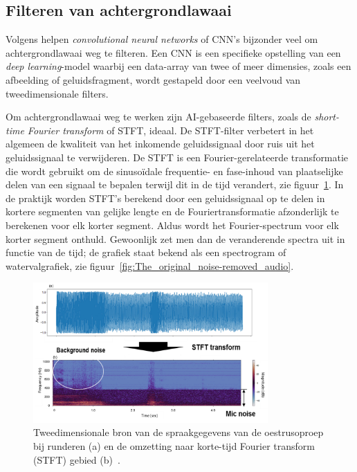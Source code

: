 \subsection{Filteren van achtergrondlawaai}
Volgens \textcite{Jung2021} helpen \textit{convolutional neural networks} of CNN's bijzonder veel om achtergrondlawaai weg te filteren. Een CNN is een specifieke opstelling van een \textit{deep learning}-model waarbij een data-array van twee of meer dimensies, zoals een afbeelding of geluidsfragment, wordt gestapeld door een veelvoud van tweedimensionale filters.

Om achtergrondlawaai weg te werken zijn AI-gebaseerde filters, zoals de \textit{short-time Fourier transform} of STFT, ideaal. De STFT-filter verbetert in het algemeen de kwaliteit van het inkomende geluidssignaal door ruis uit het geluidssignaal te verwijderen.
De STFT is een Fourier-gerelateerde transformatie die wordt gebruikt om de sinusoïdale frequentie- en fase-inhoud van plaatselijke delen van een signaal te bepalen terwijl dit in de tijd verandert, zie figuur~\ref{fig:conversion}. In de praktijk worden STFT's berekend door een geluidssignaal op te delen in kortere segmenten van gelijke lengte en de Fouriertransformatie afzonderlijk te berekenen voor elk korter segment. Aldus wordt het Fourier-spectrum voor elk korter segment onthuld. Gewoonlijk zet men dan de veranderende spectra uit in functie van de tijd; de grafiek staat bekend als een spectrogram of watervalgrafiek, zie figuur~\ref{fig:The_original_noise-removed_audio}.~\autocite{Jung2021}

\begin{figure}
    \centering
    \includegraphics[width=0.8\textwidth]{./img/conversion}
    \caption{\label{fig:conversion}Tweedimensionale bron van de spraakgegevens van de oestrusoproep bij runderen (a) en de omzetting naar korte-tijd Fourier transform (STFT) gebied (b)~\autocite{Jung2021}.}
\end{figure}


